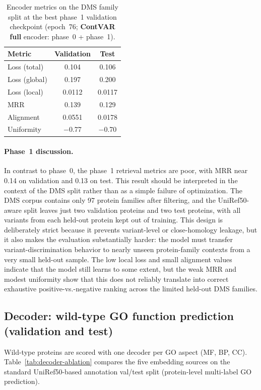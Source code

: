 \documentclass[11pt,a4paper]{article}
\begin{document}
\begin{table}[H]
\centering
\caption{Encoder metrics on the DMS family split at the best phase~1 validation checkpoint (epoch~76; \textbf{ContVAR full} encoder: phase~0 + phase~1).}
\label{tab:encoder-phase1}
\begin{tabular}{lcc}
\hline
Metric & Validation & Test \\
\hline
Loss (total) & 0.104 & 0.106 \\
Loss (global) & 0.197 & 0.200 \\
Loss (local) & 0.0112 & 0.0117 \\
MRR & 0.139 & 0.129 \\
Alignment & 0.0551 & 0.0178 \\
Uniformity & $-$0.77 & $-$0.70 \\
\hline
\end{tabular}
\end{table}

\paragraph{Phase~1 discussion.}
In contrast to phase~0, the phase~1 retrieval metrics are poor, with MRR near 0.14 on validation and 0.13 on test. This result should be interpreted in the context of the DMS split rather than as a simple failure of optimization. The DMS corpus contains only 97 protein families after filtering, and the UniRef50-aware split leaves just two validation proteins and two test proteins, with all variants from each held-out protein kept out of training. This design is deliberately strict because it prevents variant-level or close-homology leakage, but it also makes the evaluation substantially harder: the model must transfer variant-discrimination behavior to nearly unseen protein-family contexts from a very small held-out sample. The low local loss and small alignment values indicate that the model still learns to some extent, but the weak MRR and modest uniformity show that this does not reliably translate into correct exhaustive positive-vs.-negative ranking across the limited held-out DMS families.

\subsection{Decoder: wild-type GO function prediction (validation and test)}
Wild-type proteins are scored with one decoder per GO aspect (MF, BP, CC). Table~\ref{tab:decoder-ablation} compares the five embedding sources on the standard UniRef50-based annotation val/test split (protein-level multi-label GO prediction).
\end{document}
